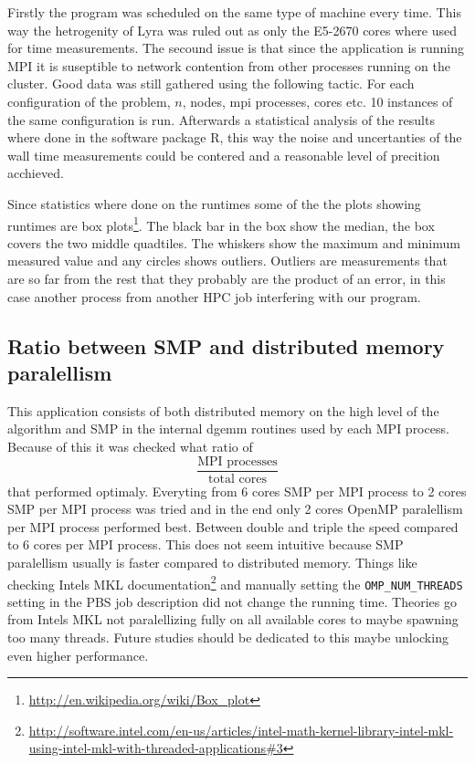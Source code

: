 \documentclass{article}
\begin{document}
Firstly the program was scheduled on the same type of machine every time. This
way the hetrogenity of Lyra was ruled out as only the E5-2670 cores where used
for time measurements. The secound issue is that since the application is running
MPI it is suseptible to network contention from other processes running on the
cluster. Good data was still gathered using the following tactic. For each configuration
of the problem, $n$, nodes, mpi processes, cores etc. 10 instances of the same
configuration is run. Afterwards a statistical analysis of the results where done
in the software package R\cite{r-project}, this way the noise and uncertanties of the
wall time measurements could be contered and a reasonable level of precition acchieved.

Since statistics where done on the runtimes some of the the plots showing runtimes 
are box plots\footnote{\url{http://en.wikipedia.org/wiki/Box_plot}}. The black bar
in the box show the median, the box covers the two middle quadtiles. The whiskers show the maximum
and minimum measured value and any circles shows outliers. Outliers are measurements
that are so far from the rest that they probably are the product of an error,
in this case another process from another HPC job interfering with our program.

\subsection{Ratio between SMP and distributed memory paralellism}
This application consists of both distributed memory on the high
level of the algorithm and SMP in the internal dgemm routines used
by each MPI process. Because of this it was checked what ratio of
\[
\frac{\text{MPI processes}}{\text{total cores}}
\]
that performed optimaly. Everyting from 6 cores SMP per MPI process to
2 cores SMP per MPI process was tried and in the end only 2 cores OpenMP
paralellism per MPI process performed best. Between double and triple the
speed compared to 6 cores per MPI process. This does not seem intuitive
because SMP paralellism usually is faster compared to distributed  memory.
Things like checking Intels MKL documentation\footnote{\url{http://software.intel.com/en-us/articles/intel-math-kernel-library-intel-mkl-using-intel-mkl-with-threaded-applications#3}} and manually setting the
\verb+OMP_NUM_THREADS+ setting in the PBS job description did not change the running time.
Theories go from Intels MKL not paralellizing fully on all available cores to maybe spawning too many threads.
Future studies should be dedicated to this maybe unlocking even higher performance.
\end{document}
